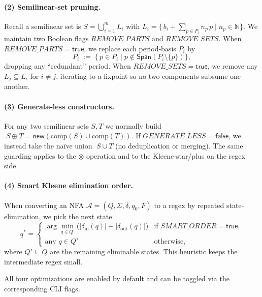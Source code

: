 \paragraph{(2) Semilinear‐set pruning.}  
Recall a semilinear set is \(S=\bigcup_{i=1}^m L_i\) with
\(\displaystyle L_i=\{\,b_i+\sum_{p\in P_i}n_p\,p\mid n_p\in\mathbb N\}\).  We maintain two Boolean flags \(\mathit{REMOVE\_PARTS}\) and \(\mathit{REMOVE\_SETS}\).  When \(\mathit{REMOVE\_PARTS}=\mathsf{true}\), we replace each period‐basis \(P_i\) by
\[
P_i \;:=\;\{\,p\in P_i \mid p\notin\mathsf{Span}(P_i\setminus\{p\})\},
\]
dropping any “redundant” period.  When \(\mathit{REMOVE\_SETS}=\mathsf{true}\), we remove any \(L_j\subseteq L_i\) for \(i\neq j\), iterating to a fixpoint so no two components subsume one another.

\paragraph{(3) Generate‐less constructors.}  
For any two semilinear sets \(S,T\) we normally build
\(\;S\mathbin{\oplus} T=\mathsf{new}(\mathrm{comp}(S)\cup\mathrm{comp}(T))\).
If \(\mathit{GENERATE\_LESS}=\mathsf{false}\), we instead take the naïve union
\(\;S\cup T\) (no deduplication or merging).  The same guarding applies to
the \(\otimes\) operation and to the Kleene‐star/plus on the regex side.

\paragraph{(4) Smart Kleene elimination order.}  
When converting an NFA \(\mathcal A=(Q,\Sigma,\delta,q_0,F)\) to a regex by repeated state‐elimination, we pick the next state
\[
q^* = 
\begin{cases}
	\arg\min_{q\in Q'}\bigl(|\delta_{\mathrm{in}}(q)|+|\delta_{\mathrm{out}}(q)|\bigr)
	&\text{if }\mathit{SMART\_ORDER}=\mathsf{true},\\
	\text{any }q\in Q' 
	&\text{otherwise},
\end{cases}
\]
where \(Q'\subseteq Q\) are the remaining eliminable states.  This heuristic keeps the intermediate regex small.

All four optimizations are enabled by default and can be toggled via the corresponding CLI flags.


\newpage
